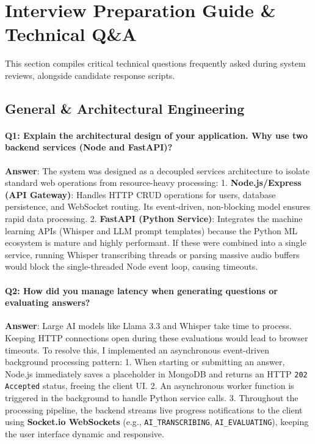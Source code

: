 \documentclass[11pt,a4paper]{article}
\begin{document}
\section{Interview Preparation Guide \& Technical Q\&A}
This section compiles critical technical questions frequently asked during system reviews, alongside candidate response scripts.

\subsection{General \& Architectural Engineering}

\paragraph{Q1: Explain the architectural design of your application. Why use two backend services (Node and FastAPI)?}
\textbf{Answer}: The system was designed as a decoupled services architecture to isolate standard web operations from resource-heavy processing:
1. \textbf{Node.js/Express (API Gateway)}: Handles HTTP CRUD operations for users, database persistence, and WebSocket routing. Its event-driven, non-blocking model ensures rapid data processing.
2. \textbf{FastAPI (Python Service)}: Integrates the machine learning APIs (Whisper and LLM prompt templates) because the Python ML ecosystem is mature and highly performant.
If these were combined into a single service, running Whisper transcribing threads or parsing massive audio buffers would block the single-threaded Node event loop, causing timeouts.

\paragraph{Q2: How did you manage latency when generating questions or evaluating answers?}
\textbf{Answer}: Large AI models like Llama 3.3 and Whisper take time to process. Keeping HTTP connections open during these evaluations would lead to browser timeouts. 
To resolve this, I implemented an asynchronous event-driven background processing pattern:
1. When starting or submitting an answer, Node.js immediately saves a placeholder in MongoDB and returns an HTTP \texttt{202 Accepted} status, freeing the client UI.
2. An asynchronous worker function is triggered in the background to handle Python service calls.
3. Throughout the processing pipeline, the backend streams live progress notifications to the client using \textbf{Socket.io WebSockets} (e.g., \texttt{AI\_TRANSCRIBING}, \texttt{AI\_EVALUATING}), keeping the user interface dynamic and responsive.
\end{document}
